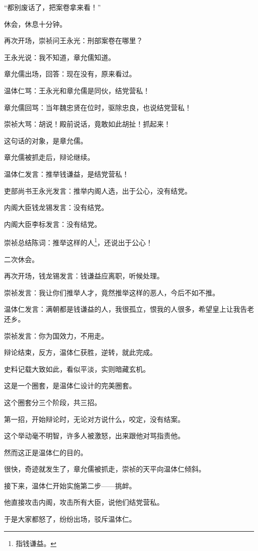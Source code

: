 \begin{multicols}{\theparacolNo}
		“都别废话了，把案卷拿来看！”

		休会，休息十分钟。

		再次开场，崇祯问王永光：刑部案卷在哪里？

		王永光说：我不知道，章允儒知道。

		章允儒出场，回答：现在没有，原来看过。

		温体仁骂：王永光和章允儒是同伙，结党营私！

		章允儒回骂：当年魏忠贤在位时，驱除忠良，也说结党营私！

		崇祯大骂：胡说！殿前说话，竟敢如此胡扯！抓起来！

		这句话的对象，是章允儒。

		章允儒被抓走后，辩论继续。

		温体仁发言：推举钱谦益，是结党营私！

		吏部尚书王永光发言：推举内阁人选，出于公心，没有结党。

		内阁大臣钱龙锡发言：没有结党。

		内阁大臣李标发言：没有结党。

		崇祯总结陈词：推举这样的人\footnote{指钱谦益。}，还说出于公心！

		二次休会。

		再次开场，钱龙锡发言：钱谦益应离职，听候处理。

		崇祯发言：我让你们推举人才，竟然推举这样的恶人，今后不如不推。

		温体仁发言：满朝都是钱谦益的人，我很孤立，恨我的人很多，希望皇上让我告老还乡。

		崇祯发言：你为国效力，不用走。

		辩论结束，反方，温体仁获胜，逆转，就此完成。

		史料记载大致如此，看似平淡，实则暗藏玄机。

		这是一个圈套，是温体仁设计的完美圈套。

		这个圈套分三个阶段，共三招。

		第一招，开始辩论时，无论对方说什么，咬定，没有结案。

		这个举动毫不明智，许多人被激怒，出来跟他对骂指责他。

		然而这正是温体仁的目的。

		很快，奇迹就发生了，章允儒被抓走，崇祯的天平向温体仁倾斜。

		接下来，温体仁开始实施第二步——挑衅。

		他直接攻击内阁，攻击所有大臣，说他们结党营私。

		于是大家都怒了，纷纷出场，驳斥温体仁。


\end{multicols}
